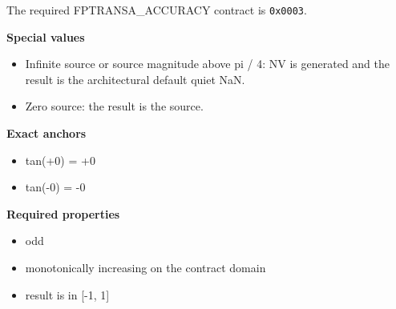 The required FPTRANSA\_ACCURACY contract is \texttt{0x0003}.

\textbf{Special values}\par
\begin{itemize}
\item Infinite source or source magnitude above pi / 4: NV is generated and the result is the architectural default quiet NaN.
\item Zero source: the result is the source.
\end{itemize}

\textbf{Exact anchors}\par
\begin{itemize}
\item tan(+0) = +0
\item tan(-0) = -0
\end{itemize}

\textbf{Required properties}\par
\begin{itemize}
\item odd
\item monotonically increasing on the contract domain
\item result is in [-1, 1]
\end{itemize}
